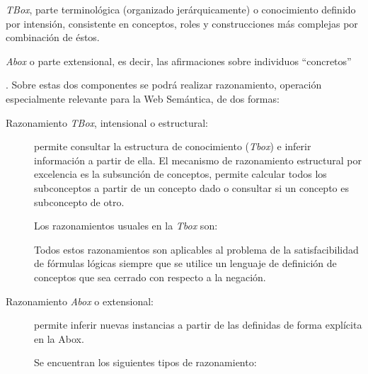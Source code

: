 \begin{inparaenum} \item \textit{TBox}, parte terminológica (organizado jerárquicamente) o
conocimiento definido por intensión, consistente en
conceptos, roles y construcciones más complejas por combinación de éstos. \item
\textit{Abox} o parte extensional, es decir, las afirmaciones sobre individuos
``concretos'' \end{inparaenum}. Sobre estas dos componentes se podrá realizar
razonamiento, operación especialmente relevante para la Web Semántica, de dos formas:
\begin{description}
\item[Razonamiento \textit{TBox}, intensional o estructural:] permite consultar la estructura de
conocimiento (\textit{Tbox}) e inferir información a partir de ella. El mecanismo de
razonamiento estructural por excelencia es la subsunción de conceptos, permite
calcular todos los subconceptos a partir de un concepto dado o consultar si un concepto
es subconcepto de otro. 

Los razonamientos usuales en la \textit{Tbox} son: 

Todos estos razonamientos son aplicables al problema de la satisfacibilidad de
fórmulas lógicas siempre que se utilice un lenguaje de definición de conceptos que
sea cerrado con respecto a la negación.

\item[Razonamiento \textit{Abox} o extensional:] permite inferir nuevas instancias a partir de las
definidas de forma explícita en la Abox. 


Se encuentran los siguientes tipos de razonamiento:
\end{description}

